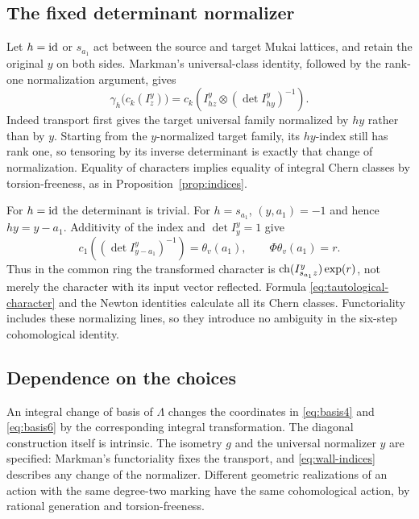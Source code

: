 \subsection{The fixed determinant normalizer}
Let $h=\operatorname{id}$ or $s_{a_1}$ act between the source and target
Mukai lattices, and retain the original $y$ on both sides.
Markman's universal-class identity, followed by the
rank-one normalization argument, gives
\begin{equation}\label{eq:wall-indices}
 \gamma_h\bigl(c_k(I_z^y)\bigr)=
 c_k\left(I_{hz}^y\otimes(\det I_{hy}^y)^{-1}\right).
\end{equation}
Indeed transport first gives the target universal family
normalized by $hy$ rather than by $y$. Starting from the
$y$-normalized target family, its $hy$-index still has
rank one, so tensoring by its inverse determinant is
exactly that change of normalization. Equality of
characters implies equality of integral Chern classes
by torsion-freeness, as in
Proposition~\ref{prop:indices}.

For $h=\operatorname{id}$ the determinant is trivial. For $h=s_{a_1}$,
$(y,a_1)=-1$ and hence $hy=y-a_1$. Additivity of the
index and $\det I_y^y=1$ give
\begin{equation}\label{eq:normalizer-line}
 c_1\left((\det I_{y-a_1}^y)^{-1}\right)=\theta_v(a_1),
 \qquad \Phi\theta_v(a_1)=r.
\end{equation}
Thus in the common ring the transformed character is
$\operatorname{ch}(I_{s_{a_1}z}^y)\exp(r)$, not merely the character
with its input vector reflected. Formula
\eqref{eq:tautological-character} and the Newton identities
calculate all its Chern classes. Functoriality includes
these normalizing lines, so they introduce no ambiguity
in the six-step cohomological identity.

\subsection{Dependence on the choices}
An integral change of basis of $\Lambda$ changes the
coordinates in \eqref{eq:basis4} and \eqref{eq:basis6}
by the corresponding integral transformation. The
diagonal construction itself is intrinsic. The isometry
$g$ and the universal normalizer $y$ are specified:
Markman's functoriality fixes the transport, and
\eqref{eq:wall-indices} describes any change of the
normalizer. Different geometric realizations of an
action with the same degree-two marking have the same
cohomological action, by rational generation and
torsion-freeness.

